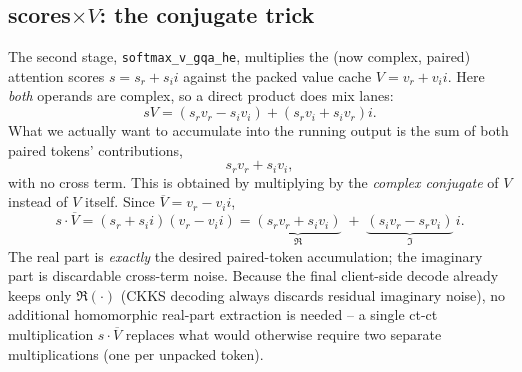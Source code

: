 \documentclass[11pt]{article}
\newcommand{\conj}[1]{\overline{#1}}
\begin{document}
\subsection{scores$\times V$: the conjugate trick}
The second stage, \texttt{softmax\_v\_gqa\_he}, multiplies the (now
complex, paired) attention scores $s = s_r + s_i i$ against the packed value
cache $V = v_r + v_i i$. Here \emph{both} operands are complex, so a direct
product does mix lanes:
\[
  s V = (s_r v_r - s_i v_i) + (s_r v_i + s_i v_r) i .
\]
What we actually want to accumulate into the running output is the sum of
both paired tokens' contributions,
\[
  s_r v_r + s_i v_i ,
\]
with no cross term. This is obtained by multiplying by the
\emph{complex conjugate} of $V$ instead of $V$ itself. Since
$\conj{V} = v_r - v_i i$,
\[
  s \cdot \conj{V}
  = (s_r + s_i i)(v_r - v_i i)
  = \underbrace{(s_r v_r + s_i v_i)}_{\Re}
    \;+\; \underbrace{(s_i v_r - s_r v_i)}_{\Im}\, i .
\]
The real part is \emph{exactly} the desired paired-token accumulation; the
imaginary part is discardable cross-term noise. Because the final client-side
decode already keeps only $\Re(\cdot)$ (CKKS decoding always discards
residual imaginary noise), no additional homomorphic real-part extraction is
needed -- a single ct-ct multiplication $s \cdot \conj{V}$ replaces what
would otherwise require two separate multiplications (one per unpacked
token).
\end{document}

